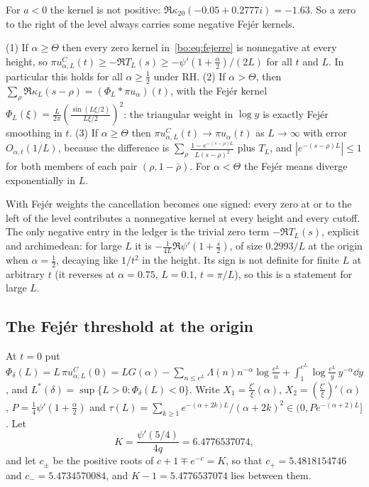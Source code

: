 For $a<0$ the kernel is not positive: $\Re\kappa_{20}(-0.05+0.2777i)=-1.63$. So a zero to the right of the level always carries some negative Fej\'er kernels.

\begin{corollary}\label{bo:cor:fejersmooth}
(1) If $\alpha\ge\Theta$ then every zero kernel in~\eqref{bo:eq:fejerre} is nonnegative at every height, so $\pi u^C_{\alpha,L}(t)\ge-\Re T_L(s)\ge-\psi'(1+\frac\alpha2)/(2L)$ for all $t$ and $L$. In particular this holds for all $\alpha\ge\frac12$ under RH. (2) If $\alpha>\Theta$, then $\sum_\rho\Re\kappa_L(s-\rho)=(\Phi_L*\pi u_\alpha)(t)$, with the Fej\'er kernel $\Phi_L(\xi)=\frac L{2\pi}(\frac{\sin(L\xi/2)}{L\xi/2})^2$: the triangular weight in $\log y$ is exactly Fej\'er smoothing in $t$. (3) If $\alpha\ge\Theta$ then $\pi u^C_{\alpha,L}(t)\to\pi u_\alpha(t)$ as $L\to\infty$ with error $O_{\alpha,t}(1/L)$, because the difference is $\sum_\rho\frac{1-e^{-(s-\rho)L}}{L(s-\rho)^2}$ plus $T_L$, and $|e^{-(s-\rho)L}|\le1$ for both members of each pair $(\rho,1-\bar\rho)$. For $\alpha<\Theta$ the Fej\'er means diverge exponentially in $L$.
\end{corollary}

With Fej\'er weights the cancellation becomes one signed: every zero at or to the left of the level contributes a nonnegative kernel at every height and every cutoff. The only negative entry in the ledger is the trivial zero term $-\Re T_L(s)$, explicit and archimedean: for large $L$ it is $-\frac1{4L}\Re\psi'(1+\frac s2)$, of size $0.2993/L$ at the origin when $\alpha=\frac12$, decaying like $1/t^2$ in the height. Its sign is not definite for finite $L$ at arbitrary $t$ (it reverses at $\alpha=0.75$, $L=0.1$, $t=\pi/L$), so this is a statement for large $L$.

\subsection{The Fej\'er threshold at the origin}

At $t=0$ put $\Phi_\delta(L)=L\,\pi u^C_{\alpha,L}(0)=LG(\alpha)-\sum_{n\le e^L}\Lambda(n)n^{-\alpha}\log\frac{e^L}n+\int_1^{e^L}\log\frac{e^L}y\,y^{-\alpha}\dd y$, and $L^*(\delta)=\sup\{L>0:\Phi_\delta(L)<0\}$. Write $X_1=\frac{\xi'}{\xi}(\alpha)$, $X_2=(\frac{\xi'}{\xi})'(\alpha)$, $P=\frac14\psi'(1+\frac\alpha2)$ and $\tau(L)=\sum_{k\ge1}e^{-(\alpha+2k)L}/(\alpha+2k)^2\in(0,Pe^{-(\alpha+2)L}]$. Let
\[
K=\frac{\psi'(5/4)}{4q}=6.4776537074,
\]
and let $c_\pm$ be the positive roots of $c+1\mp e^{-c}=K$, so that $c_+=5.4818154746$ and $c_-=5.4734570084$, and $K-1=5.4776537074$ lies between them.

